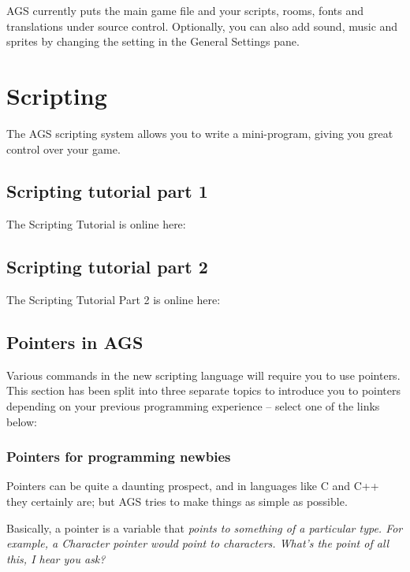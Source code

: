 AGS currently puts the main game file and your scripts, rooms, fonts and
translations under source control. Optionally, you can also add sound, music
and sprites by changing the setting in the General Settings pane.


\chapter{Scripting}%

The AGS scripting system allows you to write a mini-program, giving you great
control over your game.

\section{Scripting tutorial part 1}%

The Scripting Tutorial is online here:

\section{Scripting tutorial part 2}%

The Scripting Tutorial Part 2 is online here:


\section{Pointers in AGS}\label{Pointers}%

Various commands in the new scripting language will require you to use pointers.
This section has been split into three separate topics to introduce you
to pointers depending on your previous programming experience -- select one of the
links below:

\subsection{Pointers for programming newbies}\label{PointersForNewbies}%

Pointers can be quite a daunting prospect, and in languages like C and C++ they certainly
are; but AGS tries to make things as simple as possible.

Basically, a pointer is a variable that \it{points} to something of a particular type.
For example, a \it{Character} pointer would point to characters. What's the point of
all this, I hear you ask?

